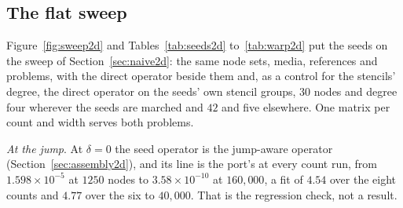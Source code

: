 \documentclass[11pt]{amsart}
\theoremstyle{definition}
\theoremstyle{remark}
\newcommand{\para}[1]{\par\smallskip\noindent\textit{#1}.\enspace}
\newcommand{\sci}[2]{#1 \times 10^{#2}}
\begin{document}
\subsection{The flat sweep}
\label{sec:flat2d}
Figure~\ref{fig:sweep2d} and Tables~\ref{tab:seeds2d}
to~\ref{tab:warp2d} put the seeds on the sweep of
Section~\ref{sec:naive2d}: the same node sets, media, references and
problems, with the direct operator beside them and, as a control for the
stencils' degree, the direct operator on the seeds' own stencil groups,
$30$ nodes and degree four wherever the seeds are marched and $42$ and five
elsewhere. One matrix per count and width serves both problems.

\para{At the jump}
At $\delta = 0$ the seed operator is the jump-aware operator
(Section~\ref{sec:assembly2d}), and its line is the port's at every count
run, from $\sci{1.598}{-5}$ at $1250$ nodes to $\sci{3.58}{-10}$ at
$160{,}000$, a fit of $4.54$ over the eight counts and $4.77$ over the six to
$40{,}000$. That is the regression check, not a result.
\end{document}
